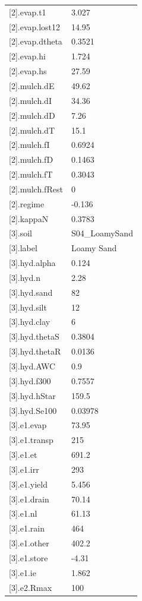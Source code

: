{\begin{longtable}{p{}p{}}
{}[2].evap.t1 & 3.027\\
{}[2].evap.lost12 & 14.95\\
{}[2].evap.dtheta & 0.3521\\
{}[2].evap.hi & 1.724\\
{}[2].evap.hs & 27.59\\
{}[2].mulch.dE & 49.62\\
{}[2].mulch.dI & 34.36\\
{}[2].mulch.dD & 7.26\\
{}[2].mulch.dT & 15.1\\
{}[2].mulch.fI & 0.6924\\
{}[2].mulch.fD & 0.1463\\
{}[2].mulch.fT & 0.3043\\
{}[2].mulch.fRest & 0\\
{}[2].regime & -0.136\\
{}[2].kappaN & 0.3783\\
{}[3].soil & S04\_LoamySand\\
{}[3].label & Loamy Sand\\
{}[3].hyd.alpha & 0.124\\
{}[3].hyd.n & 2.28\\
{}[3].hyd.sand & 82\\
{}[3].hyd.silt & 12\\
{}[3].hyd.clay & 6\\
{}[3].hyd.thetaS & 0.3804\\
{}[3].hyd.thetaR & 0.0136\\
{}[3].hyd.AWC & 0.9\\
{}[3].hyd.f300 & 0.7557\\
{}[3].hyd.hStar & 159.5\\
{}[3].hyd.Se100 & 0.03978\\
{}[3].e1.evap & 73.95\\
{}[3].e1.transp & 215\\
{}[3].e1.et & 691.2\\
{}[3].e1.irr & 293\\
{}[3].e1.yield & 5.456\\
{}[3].e1.drain & 70.14\\
{}[3].e1.nl & 61.13\\
{}[3].e1.rain & 464\\
{}[3].e1.other & 402.2\\
{}[3].e1.store & -4.31\\
{}[3].e1.ie & 1.862\\
{}[3].e2.Rmax & 100\\
\bottomrule\end{longtable}}

